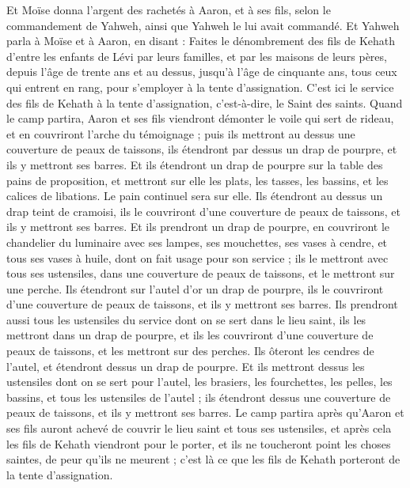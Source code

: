 \begin{multicols}{2}
Et Moïse donna l'argent des rachetés à Aaron, et à ses fils, selon le commandement de Yahweh, ainsi que Yahweh le lui avait commandé.
\VerseOne{}Et Yahweh parla à Moïse et à Aaron, en disant :
Faites le dénombrement des fils de Kehath d'entre les enfants de Lévi par leurs familles, et par les maisons de leurs pères,
depuis l'âge de trente ans et au dessus, jusqu'à l'âge de cinquante ans, tous ceux qui entrent en rang, pour s'employer à la tente d'assignation.
C'est ici le service des fils de Kehath à la tente d'assignation, c'est-à-dire, le Saint des saints.
Quand le camp partira, Aaron et ses fils viendront démonter le voile qui sert de rideau, et en couvriront l'arche du témoignage ;
puis ils mettront au dessus une couverture de peaux de taissons, ils étendront par dessus un drap de pourpre, et ils y mettront ses barres.
Et ils étendront un drap de pourpre sur la table des pains de proposition, et mettront sur elle les plats, les tasses, les bassins, et les calices de libations. Le pain continuel sera sur elle.
Ils étendront au dessus un drap teint de cramoisi, ils le couvriront d'une couverture de peaux de taissons, et ils y mettront ses barres.
Et ils prendront un drap de pourpre, en couvriront le chandelier du luminaire avec ses lampes, ses mouchettes, ses vases à cendre, et tous ses vases à huile, dont on fait usage pour son service ;
ils le mettront avec tous ses ustensiles, dans une couverture de peaux de taissons, et le mettront sur une perche.
Ils étendront sur l'autel d'or un drap de pourpre, ils le couvriront d'une couverture de peaux de taissons, et ils y mettront ses barres.
Ils prendront aussi tous les ustensiles du service dont on se sert dans le lieu saint, ils les mettront dans un drap de pourpre, et ils les couvriront d'une couverture de peaux de taissons, et les mettront sur des perches.
Ils ôteront les cendres de l'autel, et étendront dessus un drap de pourpre.
Et ils mettront dessus les ustensiles dont on se sert pour l'autel, les brasiers, les fourchettes, les pelles, les bassins, et tous les ustensiles de l'autel ; ils étendront dessus une couverture de peaux de taissons, et ils y mettront ses barres.
Le camp partira après qu'Aaron et ses fils auront achevé de couvrir le lieu saint et tous ses ustensiles, et après cela les fils de Kehath viendront pour le porter, et ils ne toucheront point les choses saintes, de peur qu'ils ne meurent ; c'est là ce que les fils de Kehath porteront de la tente d'assignation.

\end{multicols}
